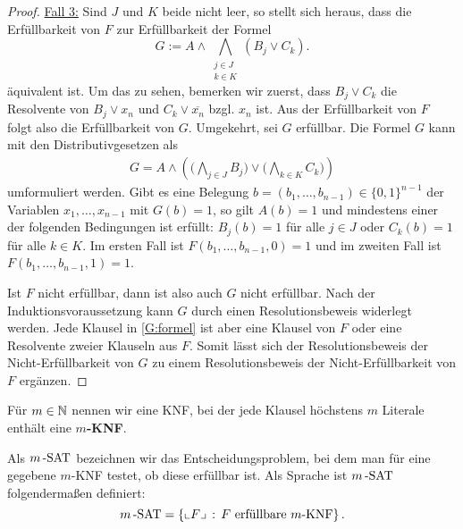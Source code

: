 \begin{proof}
	\underline{Fall 3:} Sind $J$ und $K$ beide  nicht leer, so stellt sich heraus, dass die Erfüllbarkeit von $F$ zur Erfüllbarkeit der Formel 
	\begin{equation} \label{G:formel} 
			G := A \wedge \bigwedge_{\substack{ j \in J \\ k \in K}} (B_j \vee C_k).
	\end{equation}
	äquivalent ist. 
	Um das zu sehen, bemerken wir zuerst, dass $B_j \vee C_k$ die Resolvente von $B_j \vee x_n$ und $C_k \vee \overline{x_n}$ bzgl. $x_n$ ist. Aus der Erfüllbarkeit von $F$ folgt also die Erfüllbarkeit von $G$. Umgekehrt, sei $G$ erfüllbar. Die Formel $G$ kann mit den Distributivgesetzen als
	\begin{align*}
			G = A \wedge \left( \bigg( \bigwedge_{j \in J} B_j  \bigg)  \vee \bigg( \bigwedge_{k \in K} C_k \bigg) \right)
	\end{align*}
	umformuliert werden.  Gibt es eine Belegung $b=(b_1,\ldots,b_{n-1}) \in \{0,1\}^{n-1}$ der Variablen $x_1,\ldots,x_{n-1}$ mit $G(b) = 1$, so gilt $A(b)=1$ und mindestens einer der folgenden Bedingungen ist erfüllt: $B_j(b)=1$ für alle $j \in J$ oder $C_k(b)=1$ für alle $k \in K$. Im ersten Fall ist $F(b_1,\ldots,b_{n-1}, 0 ) =1$ und im zweiten Fall ist $F(b_1,\ldots,b_{n-1},1)=1$.
	
	Ist $F$ nicht erfüllbar, dann ist also auch $G$ nicht erfüllbar. Nach der Induktionsvoraussetzung kann  $G$ durch einen Resolutionsbeweis widerlegt werden. Jede Klausel in \eqref{G:formel} ist aber eine Klausel von $F$ oder eine Resolvente zweier Klauseln aus $F$. Somit lässt sich der Resolutionsbeweis der Nicht-Erfüllbarkeit von $G$ zu einem Resolutionsbeweis der Nicht-Erfüllbarkeit von $F$ ergänzen.
\end{proof} 

\begin{defn}
	Für $m \in \mathbb{N}$ nennen wir eine KNF, bei der jede Klausel höchstens $m$ Literale enthält eine \textbf{$m$-KNF}.
	
	Als ${m}\operatorname{-SAT}$ bezeichnen wir das Entscheidungsproblem, bei dem man für eine gegebene $m$-KNF testet, ob diese erfüllbar ist. Als Sprache ist ${m}\operatorname{-SAT}$ folgendermaßen definiert: 
	\[
		{m}\operatorname{-SAT} = \left\{ {\llcorner F\lrcorner}  \,:\, F \text{ erfüllbare $m$-KNF} \right\}.
	\]
\end{defn} 

